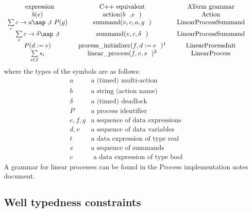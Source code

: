 \documentclass{article}
\begin{document}
\[
\begin{array}{ccc}
\text{expression} & \text{C++ equivalent} & \text{ATerm grammar} \\ 
b(e) & \text{action(}b\text{,}e\text{)} & \text{Action} \\ 
\sum\limits_{v}c\rightarrow a\mbox{\aap ,}t\ P(g) & \text{summand(}v,c,a,g%
\text{)} & \text{LinearProcessSummand} \\ 
\sum\limits_{v}c\rightarrow \delta \mbox{\aap ,}t & \text{summand(}%
v,c,\delta \text{)} & \text{LinearProcessSummand} \\ 
P(d:=e) & \text{process\_initializer(}f,d:=e\text{)\QQfnmark{%
Here $f$ is a superset of the free variables appearing in $e$.}} & \text{%
LinearProcessInit} \\ 
\sum\limits_{i\in I}s_{i} & \text{linear\_process(}f,v,s\text{)\QQfnmark{%
Here $s=[s_{1},\cdots ,s_{n}]$ is a sequence of summands, $v$ is the
sequence of process parameters of the corresponding process, and $f$ is a
sequence of free variables appearing in $s$.}} & \text{LinearProcess}%
\end{array}%
\QQfntext{-1}{
Here $f$ is a superset of the free variables appearing in $e$.}
\QQfntext{1}{
Here $s=[s_{1},\cdots ,s_{n}]$ is a sequence of summands, $v$ is the
sequence of process parameters of the corresponding process, and $f$ is a
sequence of free variables appearing in $s$.}
\]%
where the types of the symbols are as follows:%
\[
\begin{array}{cl}
a & \text{a (timed) multi-action} \\ 
b & \text{a string (action name)} \\ 
\delta & \text{a (timed) deadlock} \\ 
P & \text{a process identifier} \\ 
e,f,g & \text{a sequence of data expressions} \\ 
d,v & \text{a sequence of data variables} \\ 
t & \text{a data expression of type real} \\ 
s & \text{a sequence of summands} \\ 
c & \text{ a data expression of type bool}%
\end{array}%
\]%
A grammar for linear processes can be found in the Process implementation
notes document.

\subsection{Well typedness constraints}
\end{document}
